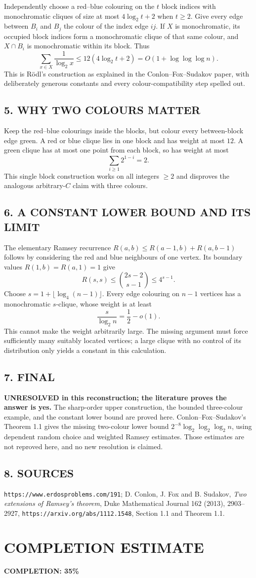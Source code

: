 Independently choose a red--blue colouring on the $t$ block indices with monochromatic cliques of size at most $4\log_2 t+2$ when $t\ge2$. Give every edge between $B_i$ and $B_j$ the colour of the index edge $ij$. If $X$ is monochromatic, its occupied block indices form a monochromatic clique of that same colour, and $X\cap B_i$ is monochromatic within its block. Thus
\[
 \sum_{x\in X}\frac1{\log_2 x}
 \le12(4\log_2 t+2)=O(1+\log\log\log n).                \tag{1}
\]
This is R\"odl's construction as explained in the Conlon--Fox--Sudakov paper, with deliberately generous constants and every colour-compatibility step spelled out.
\subsection*{5. WHY TWO COLOURS MATTER}
Keep the red--blue colourings inside the blocks, but colour every between-block edge green. A red or blue clique lies in one block and has weight at most $12$. A green clique has at most one point from each block, so has weight at most
\[
 \sum_{i\ge1}2^{1-i}=2.
\]
This single block construction works on all integers $\ge2$ and disproves the analogous arbitrary-$C$ claim with three colours.
\subsection*{6. A CONSTANT LOWER BOUND AND ITS LIMIT}
The elementary Ramsey recurrence
$R(a,b)\le R(a-1,b)+R(a,b-1)$ follows by considering the red and blue neighbours of one vertex. Its boundary values $R(1,b)=R(a,1)=1$ give
\[
 R(s,s)\le\binom{2s-2}{s-1}\le4^{s-1}.
\]
Choose $s=1+\lfloor\log_4(n-1)\rfloor$. Every edge colouring on $n-1$ vertices has a monochromatic $s$-clique, whose weight is at least
\[
 \frac{s}{\log_2 n}=\frac12-o(1).
\]
This cannot make the weight arbitrarily large. The missing argument must force sufficiently many suitably located vertices; a large clique with no control of its distribution only yields a constant in this calculation.
\subsection*{7. FINAL}
\textbf{UNRESOLVED in this reconstruction; the literature proves the answer is yes.}
The sharp-order upper construction, the bounded three-colour example, and the constant lower bound are proved here. Conlon--Fox--Sudakov's Theorem 1.1 gives the missing two-colour lower bound $2^{-8}\log_2\log_2\log_2 n$, using dependent random choice and weighted Ramsey estimates. Those estimates are not reproved here, and no new resolution is claimed.
\subsection*{8. SOURCES}
\texttt{https://www.erdosproblems.com/191}; D. Conlon, J. Fox and B. Sudakov, \emph{Two extensions of Ramsey's theorem}, Duke Mathematical Journal 162 (2013), 2903--2927, \texttt{https://arxiv.org/abs/1112.1548}, Section 1.1 and Theorem 1.1.
\section{COMPLETION ESTIMATE}
\textbf{COMPLETION: 35\%}
